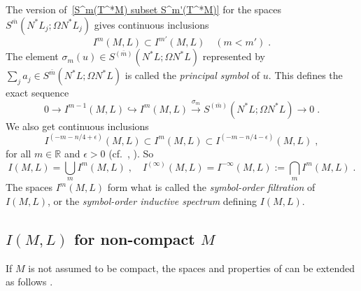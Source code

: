 \documentclass{memo-l}
\theoremstyle{plain}
\theoremstyle{definition}
\theoremstyle{remark}
\newcommand{\R}{\mathbb{R}}
\numberwithin{section}{chapter}
\numberwithin{equation}{section}%
\begin{document}
The version of~\eqref{S^m(T^*M) subset S^m'(T^*M)} for the spaces $S^{\bar m}(N^*L_j;\Omega N^*L_j)$ gives continuous inclusions
\begin{equation}\label{I^m(M L) subset I^m'(M L)}
I^m(M,L)\subset I^{m'}(M,L)\quad(m<m')\;.
\end{equation}
The element $\sigma_m(u)\in S^{(\bar m)}(N^*L;\Omega N^*L)$ represented by $\sum_ja_j\in S^{\bar m}(N^*L;\Omega N^*L)$ is called the \emph{principal symbol} of $u$. This defines the exact sequence
\[
0\to I^{m-1}(M,L)\hookrightarrow I^m(M,L) \xrightarrow{\sigma_m} S^{(\bar m)}(N^*L;\Omega N^*L)\to0\;.
\]
We also get continuous inclusions
\begin{equation}\label{sandwich for I}
I^{(-m-n/4+\epsilon)}(M,L)\subset I^m(M,L)\subset I^{(-m-n/4-\epsilon)}(M,L)\;,
\end{equation}
for all $m\in\R$ and $\epsilon>0$ (cf.\ \cite[Eq.~(6.2.5)]{Melrose1996}, \cite[Eq.~(9.35)]{MelroseUhlmann2008}). So  
\[
I(M,L)=\bigcup_mI^m(M,L)\;,\quad I^{(\infty)}(M,L)=I^{-\infty}(M,L):=\bigcap_mI^m(M,L)\;.
\]
The spaces $I^m(M,L)$ form what is called the \emph{symbol-order filtration} of $I(M,L)$, or the  \emph{symbol-order inductive spectrum} defining $I(M,L)$. 



\subsection{$I(M,L)$ for non-compact $M$}\label{ss: I(M L) - non-compact}

If $M$ is not assumed to be compact, the spaces and properties of  can be extended as follows \cite[Sections~4.2.2 and~4.3.3]{AlvKordyLeichtnam-conormal}. 
\end{document}
